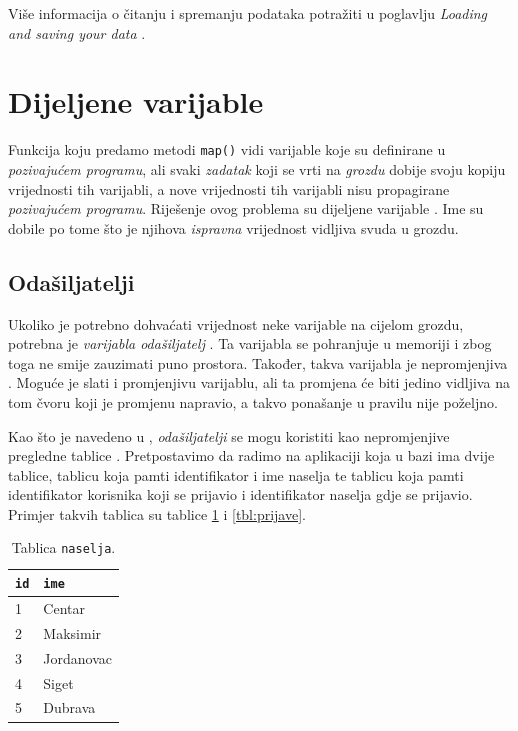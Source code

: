 \documentclass[times, utf8, zavrsni, numeric]{fer}
\begin{document}
Više informacija o čitanju i spremanju podataka potražiti u poglavlju \emph{Loading and saving your data} \cite{learningSpark}.

\section{Dijeljene varijable}
Funkcija koju predamo metodi \texttt{map()} vidi varijable koje su definirane u \emph{pozivajućem programu}, ali svaki \emph{zadatak}  koji se vrti na \emph{grozdu} dobije svoju kopiju vrijednosti tih varijabli, a nove vrijednosti tih varijabli nisu propagirane \emph{pozivajućem programu}. Riješenje ovog problema su dijeljene varijable . Ime su dobile po tome što je njihova \emph{ispravna} vrijednost vidljiva svuda u grozdu.

\subsection{Odašiljatelji}
Ukoliko je potrebno dohvaćati vrijednost neke varijable na cijelom grozdu, potrebna je \emph{varijabla odašiljatelj} . Ta varijabla se pohranjuje u memoriji i zbog toga ne smije zauzimati puno prostora. Također, takva varijabla je nepromjenjiva . Moguće je slati i promjenjivu varijablu, ali ta promjena će biti jedino vidljiva na tom čvoru koji je promjenu napravio, a takvo ponašanje u pravilu nije poželjno. 

Kao što je navedeno u \cite{officialDocumentation}, \emph{odašiljatelji} se mogu koristiti kao nepromjenjive pregledne tablice . 
Pretpostavimo da radimo na aplikaciji koja u bazi ima dvije tablice, tablicu koja pamti identifikator i ime naselja te tablicu koja pamti identifikator korisnika koji se prijavio i identifikator naselja gdje se prijavio. Primjer takvih tablica su tablice \ref{tbl:naselja} i \ref{tbl:prijave}.

\begin{table}[htb]
\caption{Tablica \texttt{naselja}.}
\label{tbl:naselja}
\centering
\begin{tabular}{ll} 
\hline
\texttt{id} & \texttt{ime}\\
\hline
1 & Centar\\
2 & Maksimir\\
3 & Jordanovac\\
4 & Siget\\
5 & Dubrava\\
\hline
\end{tabular}
\end{table}
\end{document}
